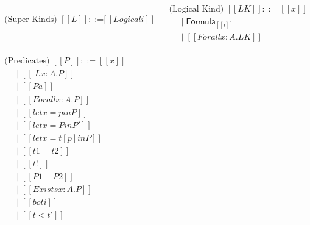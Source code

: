 \begin{center}  
  \begin{math}
    \begin{array}{llllllllllllllll}      
      \begin{array}{lll}
      \text{(Super Kinds) } [[L]] ::= & [[Logical i]]\\
      & \\
      & \\
    \end{array}
    &
    \begin{array}{lllllll}           
      \text{(Logical Kind) } [[LK]] ::= [[x]] \\
      \,\,\,\,\,\,\,\mid \mathsf{Formula}_{[[i]]} \\
      \,\,\,\,\,\,\,\mid [[Forall x : A.LK]]\\
    \end{array}\\
    & \\
      \begin{array}{llllll}
        \text{(Predicates) } [[P]] ::= [[x]] \\
        \,\,\,\,\,\,\,\mid [[\ L x : A . P]] \\
        \,\,\,\,\,\,\,\mid [[P a]] \\
        \,\,\,\,\,\,\,\mid [[Forall x : A . P]] \\
        \,\,\,\,\,\,\,\mid [[let x = p in P]] \\
        \,\,\,\,\,\,\,\mid [[let x = P in P']] \\
        \,\,\,\,\,\,\,\mid [[let x = t [ p ] in P]] \\
        \,\,\,\,\,\,\,\mid [[t1 = t2]] \\
        \,\,\,\,\,\,\,\mid [[t !]] \\
        \,\,\,\,\,\,\,\mid [[P1 + P2]] \\
        \,\,\,\,\,\,\,\mid [[Exists x : A . P]] \\
        \,\,\,\,\,\,\,\mid [[bot i]] \\
        \,\,\,\,\,\,\,\mid [[t < t']] \\
         \\
         \\
         \\
         \\
         \\
         \\        
         \\
         \\

\end{array}
\end{array}
\end{math}
\end{center}
